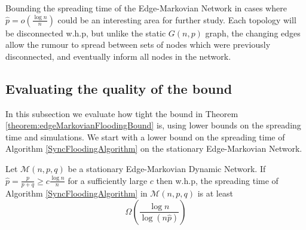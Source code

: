 Bounding the spreading time of the Edge-Markovian Network in cases where $\hat{p} = o(\frac{\log n}{n})$ could be an interesting area for further study. Each topology will be disconnected w.h.p, but unlike the static $G(n,p)$ graph, the changing edges allow the rumour to spread between sets of nodes which were previously disconnected, and eventually inform all nodes in the network.

\subsection{Evaluating the quality of the bound}\label{subsect:edgeMarkovianFloodingBoundEvaluation}


In this subsection we evaluate how tight the bound in Theorem \ref{theorem:edgeMarkovianFloodingBound} is, using lower bounds on the spreading time and simulations. %
We start with a lower bound on the spreading time of Algorithm \ref{SyncFloodingAlgorithm} on the stationary Edge-Markovian Network.

\begin{theorem}
	Let $\mathcal{M}(n, p, q)$ be a stationary Edge-Markovian Dynamic Network. If $\hat{p} = \frac{p}{p+q} \geq c \frac{\log n}{n}$ for a sufficiently large $c$ then w.h.p, the spreading time of Algorithm \ref{SyncFloodingAlgorithm} in $\mathcal{M}(n, p, q)$ is at least 
	$$
		\Omega\left(\frac{\log n}{\log (n \hat{p})}\right)
	$$
\end{theorem}

